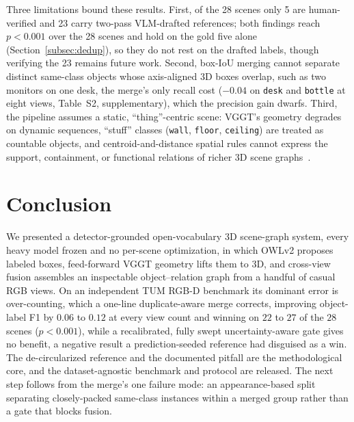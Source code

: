 Three limitations bound these results. First, of the 28 scenes only 5 are human-verified and 23 carry
two-pass VLM-drafted references; both findings reach $p<0.001$ over the 28 scenes and hold on the gold
five alone (Section~\ref{subsec:dedup}), so they do not rest on the drafted labels, though verifying the
23 remains future work. Second, box-IoU merging cannot separate distinct same-class objects whose
axis-aligned 3D boxes overlap, such as two monitors on one desk, the merge's only recall cost ($-0.04$ on
\texttt{desk} and \texttt{bottle} at eight views, Table~S2, supplementary), which the precision gain
dwarfs. Third, the pipeline assumes a static, ``thing''-centric scene: VGGT's geometry degrades on
dynamic sequences, ``stuff'' classes (\texttt{wall}, \texttt{floor}, \texttt{ceiling}) are treated as
countable objects, and centroid-and-distance spatial rules cannot express the support, containment, or
functional relations of richer 3D scene
graphs~\cite{armeni2019scenegraph,wald2020threedssg,gu2024conceptgraphs}.

\section{Conclusion}
\label{sec:conclusion}

We presented a detector-grounded open-vocabulary 3D scene-graph system, every heavy model frozen and no
per-scene optimization, in which OWLv2 proposes labeled boxes, feed-forward VGGT geometry lifts them to
3D, and cross-view fusion assembles an inspectable object--relation graph from a handful of casual RGB
views. On an independent TUM RGB-D benchmark its dominant error is over-counting, which a one-line
duplicate-aware merge corrects, improving object-label F1 by $0.06$ to $0.12$ at every view count and
winning on $22$ to $27$ of the $28$ scenes ($p<0.001$), while a recalibrated, fully swept
uncertainty-aware gate gives no benefit, a negative result a prediction-seeded reference had disguised as
a win. The de-circularized reference and the documented pitfall are the methodological core, and the
dataset-agnostic benchmark and protocol are released. The next step follows from the merge's
one failure mode: an appearance-based split separating closely-packed same-class instances within a merged
group rather than a gate that blocks fusion.

